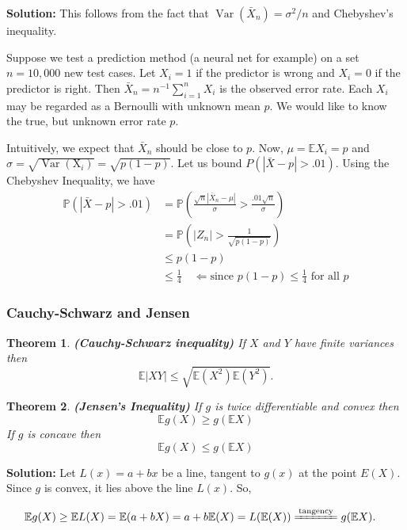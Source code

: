 \documentclass[13pt]{article}
\newtheorem{theorem}{Theorem}[section]
\theoremstyle{definition}
\newenvironment{solution}
{\color{C2}\begin{framed}\begingroup\textbf{Solution:} }
  {\endgroup\end{framed}}
\theoremstyle{remark}
\newenvironment{remark}
  {\pushQED{\qed}\renewcommand{\qedsymbol}{$\triangle$}\remarkx}
  {\popQED\endremarkx}
\newcommand{\PP}{\mathbb{P}}
\newcommand{\EE}{\mathbb{E}}
\begin{document}
\begin{solution}This follows from the fact that $\operatorname{Var}\left(\bar{X}_{n}\right)=\sigma^{2} / n$ and Chebyshev's inequality.
\end{solution}

\begin{remark}
    Suppose we test a prediction method (a neural net for example) on a set $n=10,000$ new test cases. Let $X_{i}=1$ if the predictor is wrong and $X_{i}=0$ if the predictor is right. Then $\bar{X}_{n}=n^{-1} \sum_{i=1}^{n} X_{i}$ is the observed error rate. Each $X_{i}$ may be regarded as a Bernoulli with unknown mean $p$. We would like to know the true, but unknown error rate $p$. 
    
    Intuitively, we expect that $\bar{X}_{n}$ should be close to $p$. Now, $\mu=\EE X_i=p$ and $\sigma=\sqrt{\operatorname{Var}\left(\mathrm{X}_i\right)}=\sqrt{p(1-p)}$. Let us bound $P(|\bar{X}-p|>.01)$. Using the Chebyshev Inequality, we have
$$
\begin{aligned}
\PP(|\bar{X}-p|>.01) & =\PP\left(\frac{\sqrt{n}\left|\bar{X}_{n}-\mu\right|}{\sigma}>\frac{.01 \sqrt{n}}{\sigma}\right) \\
& =\PP\left(\left|Z_{n}\right|>\frac{1}{\sqrt{p(1-p)}}\right) \\
& \leq p(1-p) \\
& \leq \frac{1}{4} \quad \Longleftarrow \text{since $p(1-p) \leq \frac{1}{4}$ for all $p$}
\end{aligned}
$$
\end{remark} 

\subsubsection{Cauchy-Schwarz and Jensen}

\begin{theorem}
    \textbf{(Cauchy-Schwarz inequality)} If $X$ and $Y$ have finite variances then
$$
\EE|X Y| \leq\sqrt{\EE\left(X^{2}\right) \EE\left(Y^{2}\right)}.
$$
\end{theorem} 

\begin{theorem}
    \textbf{(Jensen's Inequality)} If $g$ is twice differentiable and convex then
$$
\EE g(X) \geq g(\EE X)
$$
If $g$ is concave then
$$
\EE g(X) \leq g(\EE X)
$$
\end{theorem} 
\begin{solution}
    Let $L(x)=a+b x$ be a line, tangent to $g(x)$ at the point $E(X)$. Since $g$ is convex, it lies above the line $L(x)$. So,

$$
\begin{aligned}
\EE g(X) & \geq \EE L(X) =\EE(a+b X) =a+b \EE(X) =L(\EE(X))\xlongequal{\text{tangency}}g(\EE X).
\end{aligned}
$$
\end{solution}
\end{document}
